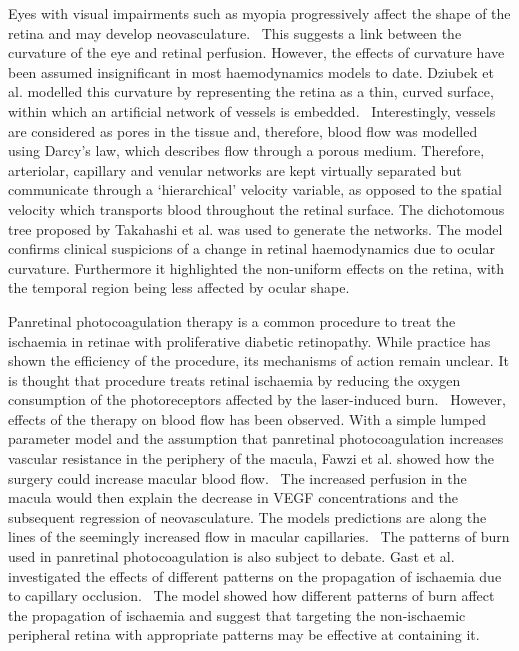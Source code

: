 \documentclass[12pt,a4paper]{journal}
\begin{document}
Eyes with visual impairments such as myopia progressively affect the shape of the retina and may develop neovasculature.~\cite{Medina_2016}
This suggests a link between the curvature of the eye and retinal perfusion.
However, the effects of curvature have been assumed insignificant in most haemodynamics models to date.
Dziubek et al. modelled this curvature by representing the retina as a thin, curved surface, within which an artificial network of vessels is embedded.~\cite{Dziubek_2015}
Interestingly, vessels are considered as pores in the tissue and, therefore, blood flow was modelled using Darcy's law, which describes flow through a porous medium.
Therefore, arteriolar, capillary and venular networks are kept virtually separated but communicate through a `hierarchical' velocity variable, as opposed to the spatial velocity which transports blood throughout the retinal surface.
The dichotomous tree proposed by Takahashi et al. was used to generate the networks.
The model confirms clinical suspicions of a change in retinal haemodynamics due to ocular curvature.
Furthermore it highlighted the non-uniform effects on the retina, with the temporal region being less affected by ocular shape.\cite{Dziubek_2015}


Panretinal photocoagulation therapy is a common procedure to treat the ischaemia in retinae with proliferative diabetic retinopathy.
While practice has shown the efficiency of the procedure, its mechanisms of action remain unclear.
It is thought that procedure treats retinal ischaemia by reducing the oxygen consumption of the photoreceptors affected by the laser-induced burn.~\cite{Fawzi_2019,Gast_2016}
However, effects of the therapy on blood flow has been observed.
With a simple lumped parameter model and the assumption that panretinal photocoagulation increases vascular resistance in the periphery of the macula, Fawzi et al. showed how the surgery could increase macular blood flow.~\cite{Fawzi_2019}
The increased perfusion in the macula would then explain the decrease in VEGF concentrations and the subsequent regression of neovasculature.
The models predictions are along the lines of the seemingly increased flow in macular capillaries.~\cite{Fawzi_2019} 
The patterns of burn used in panretinal photocoagulation is also subject to debate.
Gast et al. investigated the effects of different patterns on the propagation of ischaemia due to capillary occlusion.~\cite{Gast_2016}
The model showed how different patterns of burn affect the propagation of ischaemia and suggest that targeting the non-ischaemic peripheral retina with appropriate patterns may be effective at containing it.
\end{document}
